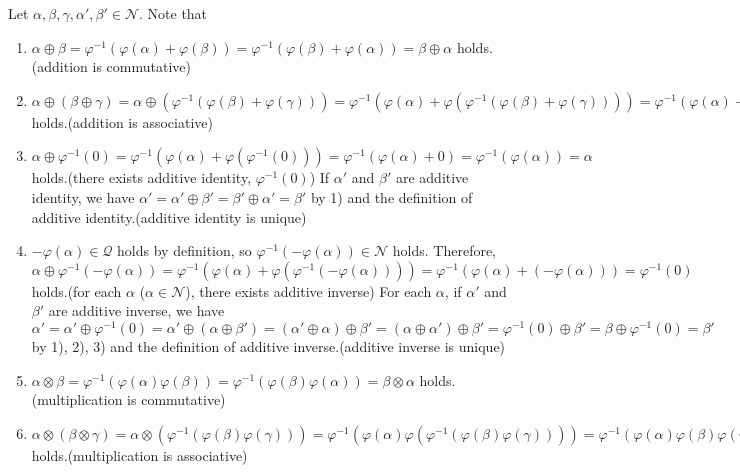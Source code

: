 \documentclass{article}
\newcommand\N{\mathcal N}
\newcommand\Q{\mathcal Q}
\begin{document}
\begin{enumerate}[label = (\alph*)]
    Let $\alpha,\beta,\gamma,\alpha',\beta'\in\N$.
    Note that
    \begin{enumerate}[label = \arabic*)]
      \item $\alpha \oplus \beta = \varphi^{-1} (\varphi(\alpha) + \varphi(\beta)) = \varphi^{-1} (\varphi(\beta) + \varphi(\alpha)) = \beta \oplus \alpha$ holds.(addition is commutative)\\
      \item $\alpha \oplus (\beta \oplus \gamma) = \alpha \oplus (\varphi^{-1}(\varphi(\beta) + \varphi(\gamma))) = \varphi^{-1}(\varphi(\alpha) + \varphi(\varphi^{-1}(\varphi(\beta) + \varphi(\gamma))))  = \varphi^{-1}(\varphi(\alpha) + (\varphi(\beta) + \varphi(\gamma))) = \varphi^{-1}((\varphi(\alpha) + \varphi(\beta)) + \varphi(\gamma)) = \varphi^{-1}(\varphi(\varphi^{-1}(\varphi(\alpha) + \varphi(\beta))) + \varphi(\gamma)) = \varphi^{-1}(\varphi(\alpha) + \varphi(\beta)) \oplus \gamma = (\alpha \oplus \beta) \oplus \gamma$ holds.(addition is associative)
      \item $\alpha \oplus \varphi^{-1}(0) = \varphi^{-1}(\varphi(\alpha) + \varphi(\varphi^{-1}(0))) = \varphi^{-1}(\varphi(\alpha) + 0) = \varphi^{-1}(\varphi(\alpha)) = \alpha$ holds.(there exists additive identity, $\varphi^{-1}(0)$)
        If $\alpha'$ and $\beta'$ are additive identity, we have $\alpha' = \alpha' \oplus \beta' = \beta' \oplus \alpha' = \beta'$ by 1) and the definition of additive identity.(additive identity is unique)
      \item $-\varphi(\alpha)\in\Q$ holds by definition, so $\varphi^{-1}(-\varphi(\alpha)) \in \N$ holds. 
       Therefore, $\alpha \oplus \varphi^{-1}(-\varphi(\alpha)) = \varphi^{-1}(\varphi(\alpha) + \varphi(\varphi^{-1}(-\varphi(\alpha)))) = \varphi^{-1}(\varphi(\alpha) +  (-\varphi(\alpha))) = \varphi^{-1}(0)$ holds.(for each $\alpha$ ($\alpha\in\N$), there exists additive inverse)
        For each $\alpha$, if $\alpha'$ and $\beta'$ are additive inverse, we have $\alpha' = \alpha' \oplus \varphi^{-1}(0) = \alpha' \oplus (\alpha \oplus \beta') = (\alpha' \oplus \alpha) \oplus \beta' = (\alpha \oplus \alpha') \oplus \beta' = \varphi^{-1}(0) \oplus \beta' = \beta \oplus \varphi^{-1}(0) = \beta'$ by 1), 2), 3) and the definition of additive inverse.(additive inverse is unique)
      \item $\alpha \otimes \beta = \varphi^{-1}(\varphi(\alpha)\varphi(\beta)) = \varphi^{-1}(\varphi(\beta)\varphi(\alpha)) = \beta \otimes \alpha$ holds.(multiplication is commutative)
      \item $\alpha \otimes (\beta \otimes \gamma) = \alpha \otimes (\varphi^{-1}(\varphi(\beta)\varphi(\gamma))) = \varphi^{-1}(\varphi(\alpha)\varphi(\varphi^{-1}(\varphi(\beta)\varphi(\gamma)))) = \varphi^{-1}(\varphi(\alpha)\varphi(\beta)\varphi(\gamma)) = \varphi^{-1}(\varphi(\varphi^{-1}(\varphi(\alpha)\varphi(\beta)))\varphi(\gamma)) = \varphi^{-1}(\varphi(\alpha)\varphi(\beta)) \otimes \gamma = (\alpha \otimes \beta) \otimes \gamma$ holds.(multiplication is associative)

\end{enumerate}
\end{enumerate}
\end{document}
